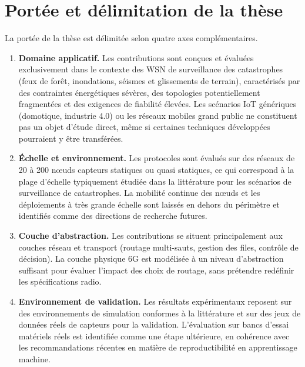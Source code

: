 \section{Portée et délimitation de la thèse}\label{sec:Portee}

La portée de la thèse est délimitée selon quatre axes complémentaires.

\begin{enumerate}
  \item \textbf{Domaine applicatif.} Les contributions sont conçues et évaluées exclusivement dans le contexte des WSN de surveillance des catastrophes (feux de forêt, inondations, séismes et glissements de terrain), caractérisés par des contraintes énergétiques sévères, des topologies potentiellement fragmentées et des exigences de fiabilité élevées\cite{erdelj2017disaster,alsayyed2025disaster}. Les scénarios IoT génériques (domotique, industrie 4.0) ou les réseaux mobiles grand public ne constituent pas un objet d'étude direct, même si certaines techniques développées pourraient y être transférées.

  \item \textbf{Échelle et environnement.} Les protocoles sont évalués sur des réseaux de 20 à 200 nœuds capteurs statiques ou quasi statiques, ce qui correspond à la plage d'échelle typiquement étudiée dans la littérature pour les scénarios de surveillance de catastrophes\cite{erdelj2017disaster,biabani_energy-efficient_2020,dampage_forest_2022-1}. La mobilité continue des nœuds et les déploiements à très grande échelle sont laissés en dehors du périmètre et identifiés comme des directions de recherche futures.

  \item \textbf{Couche d'abstraction.} Les contributions se situent principalement aux couches réseau et transport (routage multi-sauts, gestion des files, contrôle de décision). La couche physique 6G est modélisée à un niveau d'abstraction suffisant pour évaluer l'impact des choix de routage, sans prétendre redéfinir les spécifications radio\cite{saad2020vision6g,ns3_thz,amatetti2024ntn,alhilo2024ris_uav}.

  \item \textbf{Environnement de validation.} Les résultats expérimentaux reposent sur des environnements de simulation conformes à la littérature et sur des jeux de données réels de capteurs pour la validation\cite{intel_lab_data,erdelj2017disaster,dampage_forest_2022-1}. L'évaluation sur bancs d'essai matériels réels est identifiée comme une étape ultérieure, en cohérence avec les recommandations récentes en matière de reproductibilité en apprentissage machine\cite{Pineau2021Reproducibility,demichelis2025edge,demirel2026agentic}.
\end{enumerate}

